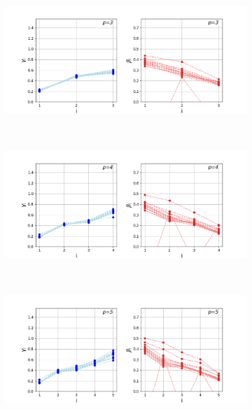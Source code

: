 \newpage
\begin{figure}[H]
	\centering
	\begin{subfigure}[t]{0.7\textwidth}
		\centering
		\includegraphics[width=\textwidth]{figures/interp/patterns/pattern_12-nodal_ER075_p-3.png}
	\end{subfigure}
	\\
	\centering
	\begin{subfigure}[t]{0.7\textwidth}
		\centering
		\includegraphics[width=\textwidth]{figures/interp/patterns/pattern_12-nodal_ER075_p-4.png}
	\end{subfigure}
	\\
	\centering
	\begin{subfigure}[t]{0.7\textwidth}
		\centering
		\includegraphics[width=\textwidth]{figures/interp/patterns/pattern_12-nodal_ER075_p-5.png}

\end{subfigure}
\end{figure}
